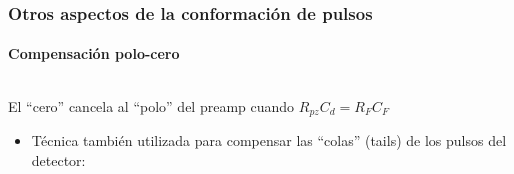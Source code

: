 \documentclass{beamer}
\begin{document}
\begin{frame}
\begin{columns}
\begin{column}{0.4\textwidth}
\begin{center}
\end{center}
\end{column}
\end{columns}
\end{frame} 

\begin{frame}
\frametitle{Otros aspectos de la conformación de pulsos}
\framesubtitle{Compensación polo-cero}
\begin{columns}
\begin{column}{0.6\textwidth}
El ``cero'' cancela al ``polo'' del preamp cuando $R_{pz}C_d = R_FC_F$ 

\begin{itemize}
\item Técnica también utilizada para compensar las ``colas'' (tails) de los 
pulsos del detector:


\end{itemize}
\end{column}
\end{columns}
\end{frame}
\end{document}
